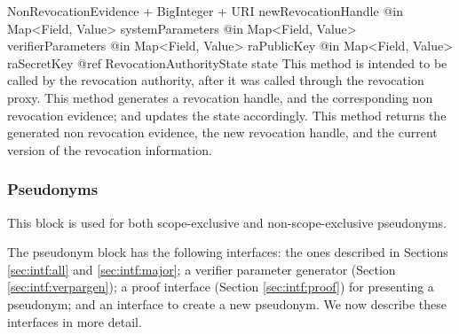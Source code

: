       \begin{method}
      {NonRevocationEvidence + BigInteger + URI}
      {newRevocationHandle}
      {
        {@in Map<Field, Value> systemParameters}
        {@in Map<Field, Value> verifierParameters}
        {@in Map<Field, Value> raPublicKey}
        {@in Map<Field, Value> raSecretKey}
        {@ref RevocationAuthorityState state}
      }
      This method is intended to be called by the revocation authority, after it
      was called through the revocation proxy.
      This method generates a revocation handle, and the corresponding non revocation
      evidence; and updates
      the state accordingly.
      This method returns the generated non revocation evidence, the new revocation handle,
      and the current version of the revocation information.
      \end{method}



    \subsubsection{Pseudonyms}

    This block is used for both scope-exclusive and non-scope-exclusive pseudonyms.

    The pseudonym block has the following interfaces:
    the ones described in Sections \ref{sec:intf:all} and \ref{sec:intf:major};
    a verifier parameter generator (Section \ref{sec:intf:verpargen});
    a proof interface (Section \ref{sec:intf:proof}) for presenting a pseudonym;
    and an interface to create a new pseudonym.
      We now describe these interfaces in more detail.


